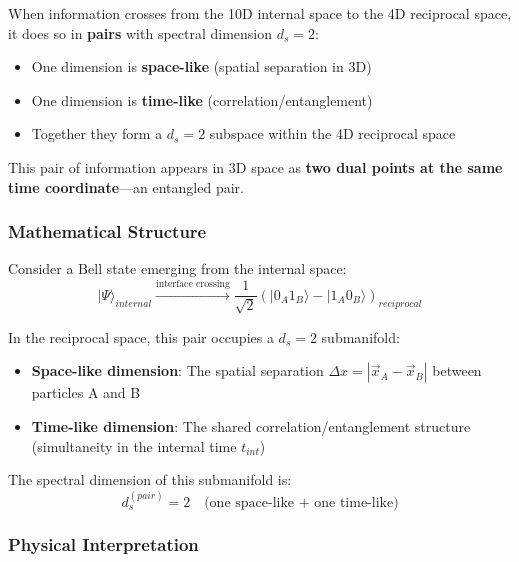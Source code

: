 \begin{insight}[Entanglement = $d_s = 2$ Information Crossing the Interface]
When information crosses from the 10D internal space to the 4D reciprocal space, it does so in \textbf{pairs} with spectral dimension $d_s = 2$:
\begin{itemize}
    \item One dimension is \textbf{space-like} (spatial separation in 3D)
    \item One dimension is \textbf{time-like} (correlation/entanglement)
    \item Together they form a $d_s = 2$ subspace within the 4D reciprocal space
\end{itemize}

This pair of information appears in 3D space as \textbf{two dual points at the same time coordinate}—an entangled pair.
\end{insight}

\subsubsection{Mathematical Structure}

Consider a Bell state emerging from the internal space:
\begin{equation}
    |\Psi\rangle_{internal} \xrightarrow{\text{interface crossing}} \frac{1}{\sqrt{2}}(|0_A 1_B\rangle - |1_A 0_B\rangle)_{reciprocal}
\end{equation}

In the reciprocal space, this pair occupies a $d_s = 2$ submanifold:
\begin{itemize}
    \item \textbf{Space-like dimension}: The spatial separation $\Delta x = |\vec{x}_A - \vec{x}_B|$ between particles A and B
    \item \textbf{Time-like dimension}: The shared correlation/entanglement structure (simultaneity in the internal time $t_{int}$)
\end{itemize}

The spectral dimension of this submanifold is:
\begin{equation}
    d_s^{(pair)} = 2 \quad \text{(one space-like + one time-like)}
\end{equation}

\subsubsection{Physical Interpretation}

